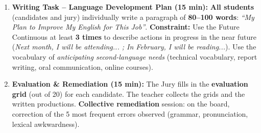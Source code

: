 \documentclass[11pt]{article}
\newcommand{\cle}[1]{{\popxbold\color{popdark}#1}}
\begin{document}
\begin{enumerate}
\begin{enumerate}
    \end{enumerate}
    \item \textbf{Writing Task -- Language Development Plan (15 min):} \textbf{All students} (candidates and jury) individually write a paragraph of \textbf{80--100 words}: \emph{``My Plan to Improve My English for This Job''}. \textbf{Constraint:} Use the \cle{Future Continuous} at least \textbf{3 times} to describe actions in progress in the near future (\emph{Next month, I will be attending... ; In February, I will be reading...}). Use the vocabulary of \emph{anticipating second-language needs} (\cle{technical vocabulary}, \cle{report writing}, \cle{oral communication}, \cle{online courses}).
    \item \textbf{Evaluation \& Remediation (15 min):} The Jury fills in the \textbf{evaluation grid} (out of 20) for each candidate. The teacher collects the grids and the written productions. \textbf{Collective remediation} session: on the board, correction of the 5 most frequent errors observed (grammar, pronunciation, lexical awkwardness).
\end{enumerate}
\end{document}
